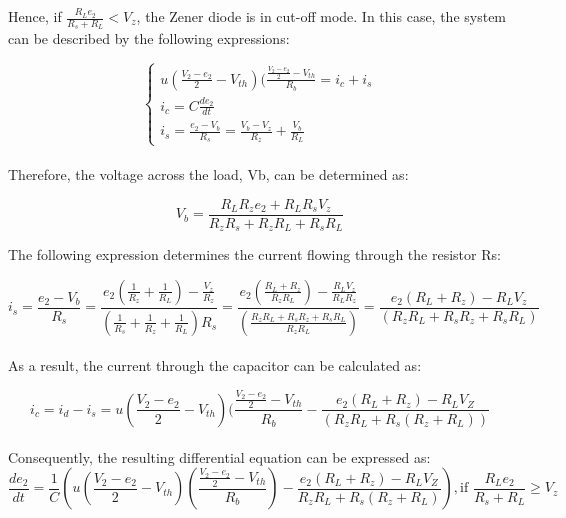 Hence, if $\frac{R_Le_2}{R_s+R_L}<V_z$, the Zener diode is in cut-off mode. In this case, the system can be described by the following expressions:

\begin{equation}
    \begin{cases}
        u(\frac{V_2-e_2}{2}-V_{th})(\frac{\frac{V_2-e_2}{2}-V_{th}}{R_b}=i_c+i_s\\
        i_c=C\frac{de_2}{dt}\\
        i_s=\frac{e_2-V_b}{R_s}=\frac{V_b-V_z}{R_z}+\frac{V_b}{R_L}
    \end{cases}
\end{equation}\\

Therefore, the voltage across the load, Vb, can be determined as:

\begin{equation}
    V_b=\frac{R_LR_ze_2+R_LR_sV_z}{R_zR_s+R_zR_L+R_sR_L}
\end{equation}

The following expression determines the current flowing through the resistor Rs:

\begin{equation}
    i_s=\frac{e_2-V_b}{R_s}=\frac{e_2(\frac{1}{R_z}+\frac{1}{R_L})-\frac{V_z}{R_z}}{(\frac{1}{R_s}+\frac{1}{R_z}+\frac{1}{R_L})R_s}=\frac{e_2(\frac{R_L+R_z}{R_zR_L})-\frac{R_LV_z}{R_LR_z}}{(\frac{R_zR_L+R_sR_z+R_sR_L}{R_zR_L})}=\frac{e_2(R_L+R_z)-R_LV_z}{(R_zR_L+R_sR_z+R_sR_L)}
\end{equation}\\

As a result, the current through the capacitor can be calculated as:

\begin{equation}
    i_c=i_d-i_s=u(\frac{V_2-e_2}{2}-V_{th})(\frac{\frac{V_2-e_2}{2}-V_{th}}{R_b}-\frac{e_2(R_L+R_z)-R_LV_Z}{(R_zR_L+R_s(R_z+R_L))}
\end{equation}\\

Consequently, the resulting differential equation can be expressed as:\\

\begin{equation}
    \frac{de_2}{dt}=\frac{1}{C}\left(u\left(\frac{V_2-e_2}{2}-V_{th}\right)\left(\frac{\frac{V_2-e_2}{2}-V_{th}}{R_b}\right)-\frac{e_2(R_L+R_z)-R_LV_Z}{R_zR_L+R_s(R_z+R_L)}\right), \text{if } \frac{R_Le_2}{R_s+R_L} \geq V_z
\end{equation}\\

